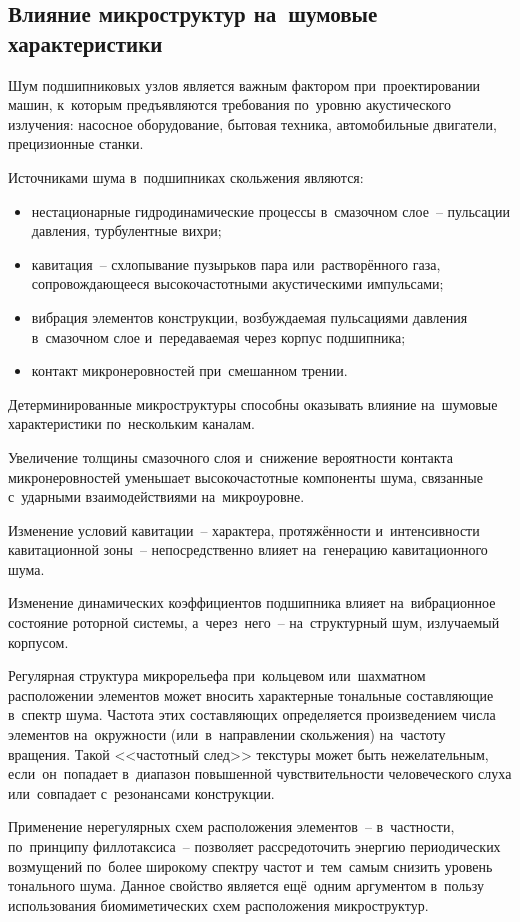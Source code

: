 \subsection{Влияние микроструктур на~шумовые характеристики}

Шум подшипниковых узлов является важным фактором при~проектировании машин, к~которым предъявляются требования по~уровню акустического излучения: насосное оборудование, бытовая техника, автомобильные двигатели, прецизионные станки.

Источниками шума в~подшипниках скольжения являются:
\begin{itemize}
\item нестационарные гидродинамические процессы в~смазочном слое~-- пульсации давления, турбулентные вихри;
\item кавитация~-- схлопывание пузырьков пара или~растворённого газа, сопровождающееся высокочастотными акустическими импульсами;
\item вибрация элементов конструкции, возбуждаемая пульсациями давления в~смазочном слое и~передаваемая через корпус подшипника;
\item контакт микронеровностей при~смешанном трении.
\end{itemize}

Детерминированные микроструктуры способны оказывать влияние на~шумовые характеристики по~нескольким каналам.

Увеличение толщины смазочного слоя и~снижение вероятности контакта микронеровностей уменьшает высокочастотные компоненты шума, связанные с~ударными взаимодействиями на~микроуровне.

Изменение условий кавитации~-- характера, протяжённости и~интенсивности кавитационной зоны~-- непосредственно влияет на~генерацию кавитационного шума.

Изменение динамических коэффициентов подшипника влияет на~вибрационное состояние роторной системы, а~через~него~-- на~структурный шум, излучаемый корпусом.

Регулярная структура микрорельефа при~кольцевом или~шахматном расположении элементов может вносить характерные тональные составляющие в~спектр шума. Частота этих составляющих определяется произведением числа элементов на~окружности (или~в~направлении скольжения) на~частоту вращения. Такой <<частотный след>> текстуры может быть нежелательным, если~он~попадает в~диапазон повышенной чувствительности человеческого слуха или~совпадает с~резонансами конструкции.

Применение нерегулярных схем расположения элементов~-- в~частности, по~принципу филлотаксиса~-- позволяет рассредоточить энергию периодических возмущений по~более широкому спектру частот и~тем~самым снизить уровень тонального шума. Данное свойство является ещё~одним аргументом в~пользу использования биомиметических схем расположения микроструктур.

